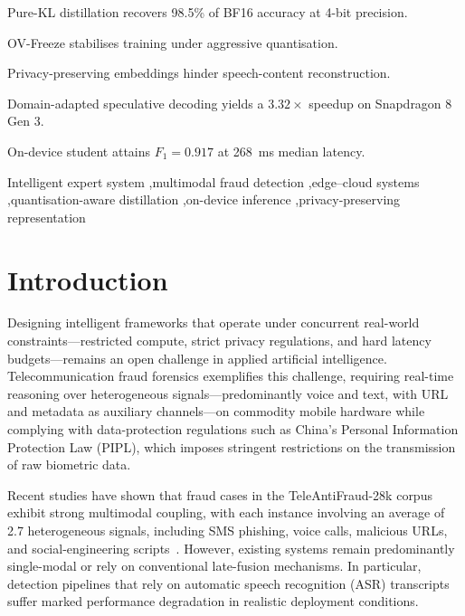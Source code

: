 \documentclass[a4paper,fleqn]{cas-sc}
\begin{document}
\begin{highlights}
\item Pure-KL distillation recovers 98.5\% of BF16 accuracy at 4-bit precision.
\item OV-Freeze stabilises training under aggressive quantisation.
\item Privacy-preserving embeddings hinder speech-content reconstruction.
\item Domain-adapted speculative decoding yields a $3.32\times$ speedup on Snapdragon 8 Gen 3.
\item On-device student attains $F_1=0.917$ at 268~ms median latency.
\end{highlights}

\begin{keywords}  
Intelligent expert system
\sep multimodal fraud detection
\sep edge--cloud systems 
\sep quantisation-aware distillation 
\sep on-device inference 
\sep privacy-preserving representation
\end{keywords}

\maketitle

\section{Introduction}

Designing intelligent frameworks that operate under concurrent real-world constraints---restricted compute, strict privacy regulations, and hard latency budgets---remains an open challenge in applied artificial intelligence. Telecommunication fraud forensics exemplifies this challenge, requiring real-time reasoning over heterogeneous signals---predominantly voice and text, with URL and metadata as auxiliary channels---on commodity mobile hardware while complying with data-protection regulations such as China's Personal Information Protection Law (PIPL), which imposes stringent restrictions on the transmission of raw biometric data.

Recent studies have shown that fraud cases in the TeleAntiFraud-28k corpus exhibit strong multimodal coupling, with each instance involving an average of 2.7 heterogeneous signals, including SMS phishing, voice calls, malicious URLs, and social-engineering scripts~\citep{1}. However, existing systems remain predominantly single-modal or rely on conventional late-fusion mechanisms. In particular, detection pipelines that rely on automatic speech recognition (ASR) transcripts suffer marked performance degradation in realistic deployment conditions.
\end{document}
